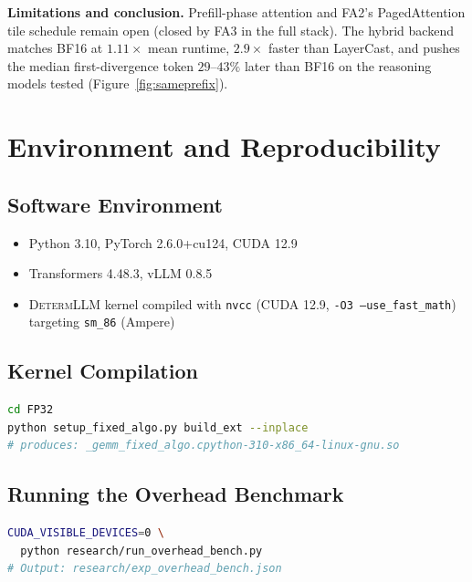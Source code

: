 \documentclass{article}
\newcommand{\dllm}{\textsc{DetermLLM}\xspace}
\begin{document}
\textbf{Limitations and conclusion.}
\label{sec:discussion}
Prefill-phase attention and FA2's PagedAttention tile schedule remain open
(closed by FA3 in the full stack). The hybrid backend matches BF16 at
$1.11\times$ mean runtime, $2.9\times$ faster than LayerCast, and pushes
the median first-divergence token $29$--$43\%$ later than BF16 on the
reasoning models tested (Figure~\ref{fig:sameprefix}).




\newpage
\appendix

\section{Environment and Reproducibility}
\label{app:env}

\subsection{Software Environment}

\begin{itemize}
  \item Python 3.10, PyTorch 2.6.0+cu124, CUDA 12.9
  \item Transformers 4.48.3, vLLM 0.8.5
  \item \dllm kernel compiled with \texttt{nvcc} (CUDA 12.9, \texttt{-O3 --use\_fast\_math})
        targeting \texttt{sm\_86} (Ampere)
\end{itemize}

\subsection{Kernel Compilation}

\begin{lstlisting}[language=bash]
cd FP32
python setup_fixed_algo.py build_ext --inplace
# produces: _gemm_fixed_algo.cpython-310-x86_64-linux-gnu.so
\end{lstlisting}

\subsection{Running the Overhead Benchmark}

\begin{lstlisting}[language=bash]
CUDA_VISIBLE_DEVICES=0 \
  python research/run_overhead_bench.py
# Output: research/exp_overhead_bench.json
\end{lstlisting}
\end{document}
